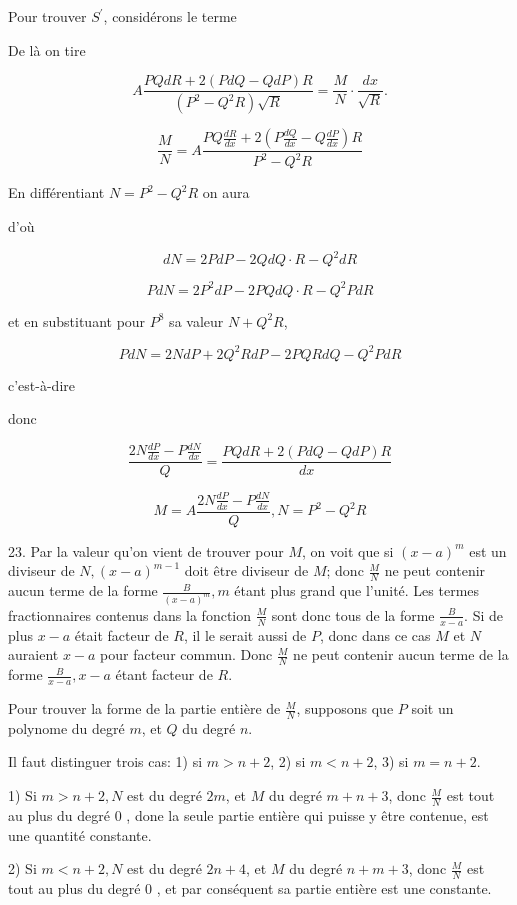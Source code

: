 \documentclass{article}
\begin{document}
Pour trouver \(S^{\prime}\), considérons le terme

De là on tire

\[
A \frac{P Q d R+2(P d Q-Q d P) R}{\left(P^{2}-Q^{2} R\right) \sqrt{R}}=\frac{M}{N} \cdot \frac{d x}{\sqrt{R}} .
\]

\[
\frac{M}{N}=A \frac{P Q \frac{d R}{d x}+2\left(P \frac{d Q}{d x}-Q \frac{d P}{d x}\right) R}{P^{2}-Q^{2} R}
\]

En différentiant \(N=P^{2}-Q^{2} R\) on aura

d'où

\[
d N=2 P d P-2 Q d Q \cdot R-Q^{2} d R
\]

\[
P d N=2 P^{2} d P-2 P Q d Q \cdot R-Q^{2} P d R
\]

et en substituant pour \(P^{8}\) sa valeur \(N+Q^{2} R\),

\[
P d N=2 N d P+2 Q^{2} R d P-2 P Q R d Q-Q^{2} P d R
\]

c'est-à-dire

donc

\[
\frac{2 N \frac{d P}{d x}-P \frac{d N}{d x}}{Q}=\frac{P Q d R+2(P d Q-Q d P) R}{d x}
\]

\[
M=A \frac{2 N \frac{d P}{d x}-P \frac{d N}{d x}}{Q}, N=P^{2}-Q^{2} R
\]

23. Par la valeur qu'on vient de trouver pour \(M\), on voit que si \((x-a)^{m}\) est un diviseur de \(N,(x-a)^{m-1}\) doit être diviseur de \(M\); donc \(\frac{M}{N}\) ne peut contenir aucun terme de la forme \(\frac{B}{(x-a)^{m}}, m\) étant plus grand que l'unité. Les termes fractionnaires contenus dans la fonction \(\frac{M}{N}\) sont donc tous de la forme \(\frac{B}{x-a}\). Si de plus \(x-a\) était facteur de \(R\), il le serait aussi de \(P\), donc dans ce cas \(M\) et \(N\) auraient \(x-a\) pour facteur commun. Donc
\(\frac{M}{N}\) ne peut contenir aucun terme de la forme \(\frac{B}{x-a}, x-a\) étant facteur de \(R\).

Pour trouver la forme de la partie entière de \(\frac{M}{N}\), supposons que \(P\) soit un polynome du degré \(m\), et \(Q\) du degré \(n\).

Il faut distinguer trois cas:
1) si \(m>n+2\),
2) si \(m<n+2\),
3) si \(m=n+2\).

1) Si \(m>n+2, N\) est du degré \(2 m\), et \(M\) du degré \(m+n+3\), donc \(\frac{M}{N}\) est tout au plus du degré 0 , done la seule partie entière qui puisse y être contenue, est une quantité constante.

2) Si \(m<n+2, N\) est du degré \(2 n+4\), et \(M\) du degré \(n+m+3\), donc \(\frac{M}{N}\) est tout au plus du degré 0 , et par conséquent sa partie entière est une constante.
\end{document}
